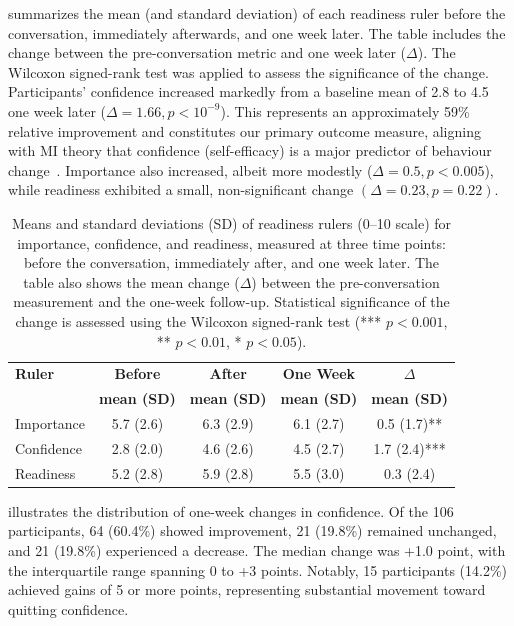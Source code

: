  summarizes the mean (and standard deviation) of each readiness ruler before the conversation, immediately afterwards, and one week later. The table includes the change between the pre-conversation metric and one week later ($\Delta$). The Wilcoxon signed-rank test was applied to assess the significance of the change. Participants' confidence increased markedly from a baseline mean of 2.8 to 4.5 one week later ($\Delta=1.66, p<10^{-9}$). This represents an approximately 59\% relative improvement and constitutes our primary outcome measure, aligning with MI theory that confidence (self-efficacy) is a major predictor of behaviour change~\citep{Gwaltney2009-wj,Abar2013}. Importance also increased, albeit more modestly ($\Delta=0.5, p<0.005$), while readiness exhibited a small, non-significant change $(\Delta=0.23, p=0.22)$.

\begin{table}[ht!]
	\centering
	\small
	\setlength{\tabcolsep}{4pt}
	\renewcommand{\arraystretch}{1.1}
	\begin{tabular}{@{}lcccc@{}}
		\toprule
		\textbf{Ruler} & \textbf{Before}    & \textbf{After}     & \textbf{One Week}  & \textbf{$\Delta$}  \\
		               & \textbf{mean (SD)} & \textbf{mean (SD)} & \textbf{mean (SD)} & \textbf{mean (SD)} \\
		\midrule
		Importance     & 5.7 (2.6)          & 6.3 (2.9)          & 6.1 (2.7)          & 0.5 (1.7)**        \\
		Confidence     & 2.8 (2.0)          & 4.6 (2.6)          & 4.5 (2.7)          & 1.7 (2.4)***       \\
		Readiness      & 5.2 (2.8)          & 5.9 (2.8)          & 5.5 (3.0)          & 0.3 (2.4)          \\
		\bottomrule
	\end{tabular}
	\caption[MIBot Readiness Ruler Summary]{Means and standard deviations (SD) of readiness rulers (0--10 scale) for importance, confidence, and readiness, measured at three time points: before the conversation, immediately after, and one week later. The table also shows the mean change ($\Delta$) between the pre-conversation measurement and the one-week follow-up. Statistical significance of the change is assessed using the Wilcoxon signed-rank test (*** $p < 0.001$, ** $p < 0.01$, * $p < 0.05$).}
	\label{table:mibot_ruler_summary}
\end{table}

 illustrates the distribution of one-week changes in confidence. Of the 106 participants, 64 (60.4\%) showed improvement, 21 (19.8\%) remained unchanged, and 21 (19.8\%) experienced a decrease. The median change was +1.0 point, with the interquartile range spanning 0 to +3 points. Notably, 15 participants (14.2\%) achieved gains of 5 or more points, representing substantial movement toward quitting confidence.

